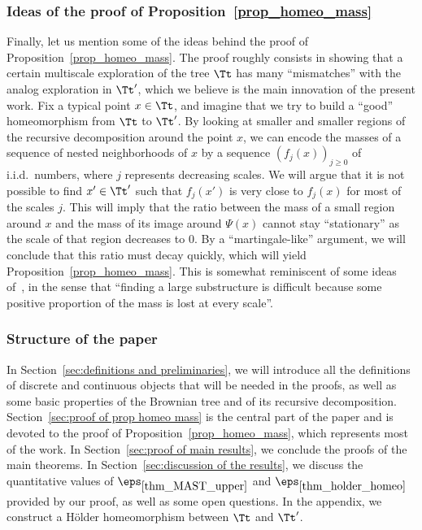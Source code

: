 \subsubsection*{Ideas of the proof of Proposition~\ref{prop_homeo_mass}}
Finally, let us mention some of the ideas behind the proof of Proposition~\ref{prop_homeo_mass}. The proof roughly consists in showing that a certain multiscale exploration of the tree $\Tt$ has many ``mismatches'' with the analog exploration in $\Tt'$, which we believe is the main innovation of the present work.
Fix a typical point $x \in \Tt$, and imagine that we try to build a ``good'' homeomorphism from $\Tt$ to $\Tt'$. By looking at smaller and smaller regions of the recursive decomposition around the point $x$, we can encode the masses of a sequence of nested neighborhoods of $x$ by a sequence $\left(f_j(x) \right)_{j \geq 0}$ of
i.i.d.\ numbers, where $j$ represents decreasing scales.
We will argue that it is not possible to find $x' \in \Tt'$ such that $f_j(x')$ is very close to $f_j(x)$ for most of the scales $j$.
This will imply that the ratio between the mass of a small region around $x$ and the mass of its image around $\Psi(x)$ cannot stay ``stationary'' as the scale of that region decreases to $0$.
By a ``martingale-like'' argument, we will conclude that this ratio must decay quickly, which will yield Proposition~\ref{prop_homeo_mass}. This is somewhat reminiscent of some ideas of~\cite{BBDFGMP22}, in the sense that ``finding a large substructure is difficult because some positive proportion of the mass is lost at every scale''.

\subsubsection*{Structure of the paper}
In Section~\ref{sec:definitions and preliminaries}, we will introduce all the definitions of discrete and continuous objects that will be needed in the proofs, as well as some basic properties of the Brownian tree and of its recursive decomposition.
Section~\ref{sec:proof of prop homeo mass} is the central part of the paper and is devoted to the proof of Proposition~\ref{prop_homeo_mass}, which represents most of the work.
In Section~\ref{sec:proof of main results}, we conclude the proofs of the main theorems.
In Section~\ref{sec:discussion of the results}, we discuss the quantitative values of $\eps_{\ref{thm_MAST_upper}}$ and $\eps_{\ref{thm_holder_homeo}}$ provided by our proof, as well as some open questions.
In the appendix, we construct a Hölder homeomorphism between $\Tt$ and $\Tt'$.

